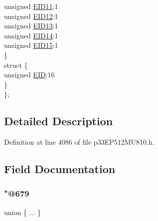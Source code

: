 \begin{DoxyCompactItemize}
\begin{tabbing}
\>\>unsigned \hyperlink{structtag_c1_r_x_f6_e_i_d_b_i_t_s_a710bdb0d602deb021b0be99066008018}{EID11}:1\\
\>\>unsigned \hyperlink{structtag_c1_r_x_f6_e_i_d_b_i_t_s_aa347bb85867bd8d4e0124f7cff8c6472}{EID12}:1\\
\>\>unsigned \hyperlink{structtag_c1_r_x_f6_e_i_d_b_i_t_s_a37d5f3edcbf6ef62f848fd4f3c584f79}{EID13}:1\\
\>\>unsigned \hyperlink{structtag_c1_r_x_f6_e_i_d_b_i_t_s_a7ffc0b0e0d99b8476b6f9a45337c17ab}{EID14}:1\\
\>\>unsigned \hyperlink{structtag_c1_r_x_f6_e_i_d_b_i_t_s_a293cd7dc1746257fa75a60cbd9383cd7}{EID15}:1\\
\>\} \\
\>struct \{\\
\>\>unsigned \hyperlink{structtag_c1_r_x_f6_e_i_d_b_i_t_s_ae80b378c9141f7c03e0b4e55b5f4b54d}{EID}:16\\
\>\} \\
\}; \\

\end{tabbing}\end{DoxyCompactItemize}


\subsection{Detailed Description}


Definition at line 4086 of file p33\+E\+P512\+M\+U810.\+h.



\subsection{Field Documentation}
\mbox{\label{structtag_c1_r_x_f6_e_i_d_b_i_t_s_ad5eb88c193ebd590860c4b2d1db4d724}} 
\subsubsection{\texorpdfstring{"@679}{@679}}
{\footnotesize\ttfamily union \{ ... \} }

\mbox{\label{structtag_c1_r_x_f6_e_i_d_b_i_t_s_ae80b378c9141f7c03e0b4e55b5f4b54d}} 
